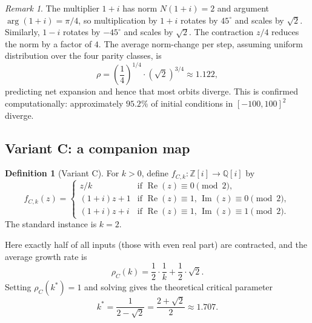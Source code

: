 \documentclass[12pt]{article}
\theoremstyle{plain}
\theoremstyle{definition}
\newtheorem{definition}[theorem]{Definition}
\theoremstyle{remark}
\newtheorem{remark}[theorem]{Remark}
\theoremstyle{definition}
\newcommand{\Zi}{\mathbb{Z}[i]}
\newcommand{\Qi}{\mathbb{Q}[i]}
\newcommand{\re}{\operatorname{Re}}
\newcommand{\im}{\operatorname{Im}}
\begin{document}
\begin{remark}
The multiplier $1+i$ has norm $N(1+i) = 2$ and argument
$\arg(1+i) = \pi/4$, so multiplication by $1+i$ rotates by $45^\circ$
and scales by $\sqrt{2}$.
Similarly, $1-i$ rotates by $-45^\circ$ and scales by $\sqrt{2}$.
The contraction $z/4$ reduces the norm by a factor of $4$.
The average norm-change per step, assuming uniform distribution
over the four parity classes, is
\[
    \rho = \left(\frac{1}{4}\right)^{1/4} \cdot
           (\sqrt{2})^{3/4} \approx 1.122,
\]
predicting net expansion and hence that most orbits diverge.
This is confirmed computationally: approximately $95.2\%$ of
initial conditions in $[-100,100]^2$ diverge.
\end{remark}

\subsection{Variant C: a companion map}
\label{subsec:variantC}

\begin{definition}[Variant C]
For $k > 0$, define $f_{C,k} : \Zi \to \Qi$ by
\begin{equation}
\label{eq:variantC}
    f_{C,k}(z) =
    \begin{cases}
        z/k              & \text{if } \re(z) \equiv 0 \pmod{2},  \\
        (1+i)z + 1       & \text{if } \re(z) \equiv 1, \,
                                       \im(z) \equiv 0 \pmod{2}, \\
        (1+i)z + i       & \text{if } \re(z) \equiv 1, \,
                                       \im(z) \equiv 1 \pmod{2}.
    \end{cases}
\end{equation}
The standard instance is $k=2$.
\end{definition}

Here exactly half of all inputs (those with even real part) are
contracted, and the average growth rate is
\begin{equation}
\label{eq:variantC_growth}
    \rho_C(k) = \frac{1}{2} \cdot \frac{1}{k} + \frac{1}{2} \cdot \sqrt{2}.
\end{equation}
Setting $\rho_C(k^*) = 1$ and solving gives the theoretical
critical parameter
\begin{equation}
\label{eq:kstar}
    k^* = \frac{1}{2 - \sqrt{2}} = \frac{2+\sqrt{2}}{2} \approx 1.707.
\end{equation}
\end{document}
